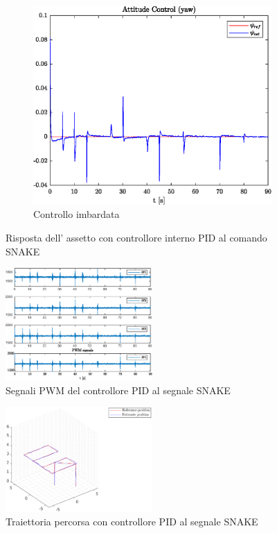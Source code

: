 \begin{figure}
\begin{subfigure}{0.45\textwidth}
	\end{subfigure}
	\hfill
	\begin{subfigure}{0.45\textwidth}
		\centering
		\includegraphics[width=1\textwidth]{Simulazioni/Figure/PID/SNAKE/AttitudeControlYaw}
		\caption{Controllo imbardata}
	\end{subfigure}
	\caption{Risposta dell' assetto con controllore interno PID al comando SNAKE}
\end{figure}


\begin{figure}
	\centering
	\includegraphics[width=0.5\textwidth]{Simulazioni/Figure/PID/SNAKE/PWM}
	\caption{Segnali PWM del controllore PID al segnale SNAKE}
\end{figure}
\begin{figure}
	\centering
	\includegraphics[width=0.5\textwidth]{Simulazioni/Figure/PID/SNAKE/Trajectory}
	\caption{Traiettoria percorsa con controllore PID al segnale SNAKE}
\end{figure}

